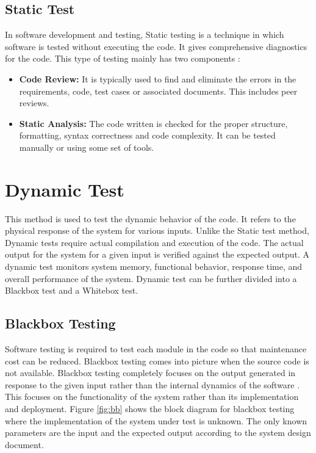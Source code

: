 \documentclass[10pt]{ruthesis}
\begin{document}
\subsection{Static Test}
In software development and testing, Static testing is a technique in which software is tested without executing the code. It gives comprehensive diagnostics for the code. This type of testing mainly has two components \cite{site10}:
\begin{itemize}
	\item \textbf{Code Review:} It is typically used to find and eliminate the errors in the requirements, code, test cases or associated documents. This includes peer reviews.
	\item \textbf{Static Analysis:} The code written is checked for the proper structure, formatting, syntax correctness and code complexity. It can be tested manually or using some set of tools.
\end{itemize}

\section{Dynamic Test}
This method is used to test the dynamic behavior of the code. It refers to the physical response of the system for various inputs. Unlike the Static test method, Dynamic tests require actual compilation and execution of the code. The actual output for the system for a given input is verified against the expected output. A dynamic test monitors system memory, functional behavior, response time, and overall performance of the system. Dynamic test can be further divided into a Blackbox test and a Whitebox test.

\subsection{Blackbox Testing}

Software testing is required to test each module in the code so that maintenance cost can be reduced. Blackbox testing comes into picture when the source code is not available. Blackbox testing completely focuses on the output generated in response to the given input rather than the internal dynamics of the software \cite{ref24}. This focuses on the functionality of the system rather than its implementation and deployment. Figure \ref{fig:bb} shows the block diagram for blackbox testing where the implementation of the system under test is unknown. The only known parameters are the input and the expected output according to the system design document.
\end{document}
